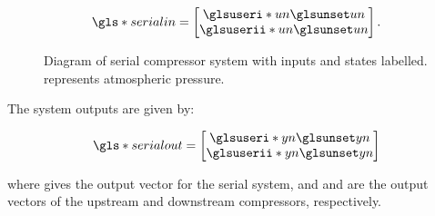 \begin{equation}
  \g{serialin} = \begin{bmatrix} \gi{un} \\ \gii{un} \end{bmatrix}.
\end{equation}


\begin{figure}
  \centering
  \togglefalse{compleg}
  \togglefalse{complabel}
  \newdimen\xcoord
  \newdimen\ycoord
  \newdimen\xcoordb
  \newdimen\ycoordb



  \caption[Diagram of serial compressor system.]{Diagram of serial compressor system with inputs and states labelled.  represents atmospheric pressure.}
  \label{fig:mod:serial}
\end{figure}


The system outputs are given by:

\begin{equation}
  \g{serialout} =
  \begin{bmatrix}
    \gi{yn}\\
    \gii{yn}
  \end{bmatrix}
\end{equation}

\noindent where  gives the output vector for the serial system, and  and  are the output vectors of the upstream and downstream compressors, respectively.

